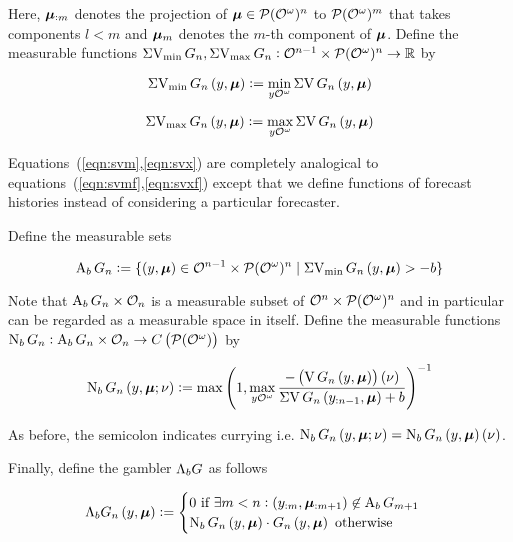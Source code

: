 Here, $\bm{\mu}_{:m}$ denotes the projection of $\bm{\mu} \in \mathcal{P}(\mathcal{O}^\omega)^n$ to $\mathcal{P}(\mathcal{O}^\omega)^m$ that takes components $l < m$ and $\bm{\mu}_m$ denotes the $m$-th component of $\bm{\mu}$. Define the measurable functions $\operatorname{\Sigma V_{\min}} G_n, \operatorname{\Sigma V_{\max}} G_n: \mathcal{O}^{n-1} \times \mathcal{P}(\mathcal{O}^\omega)^n  \rightarrow \mathbb{R}$ by

\begin{equation}
\label{eqn:svm}
\operatorname{\Sigma V_{\min}} G_n\left(y,\bm{\mu}\right) := \min_{y\mathcal{O}^\omega}{\operatorname{\Sigma V} G_n\left(y,\bm{\mu}\right)}
\end{equation}

\begin{equation}
\label{eqn:svx}
\operatorname{\Sigma V_{\max}} G_n\left(y,\bm{\mu}\right) := \max_{y\mathcal{O}^\omega}{\operatorname{\Sigma V} G_n\left(y,\bm{\mu}\right)}
\end{equation}

Equations~(\ref{eqn:svm},\ref{eqn:svx}) are completely analogical to equations~(\ref{eqn:svmf},\ref{eqn:svxf}) except that we define functions of forecast histories instead of considering a particular forecaster.

Define the measurable sets

\begin{equation}
\operatorname{A}_b G_n:=\{\left(y,\bm{\mu}\right) \in \mathcal{O}^{n-1} \times \mathcal{P}(\mathcal{O}^\omega)^n \mid \operatorname{\Sigma V_{\min}} G_n\left(y,\bm{\mu}\right) > -b\}
\end{equation}

Note that $\operatorname{A}_b G_n \times \mathcal{O}_n$ is a measurable subset of $\mathcal{O}^n \times \mathcal{P}(\mathcal{O}^\omega)^n$ and in particular can be regarded as a measurable space in itself. Define the measurable functions $\operatorname{N}_b G_n: \operatorname{A}_b G_n \times \mathcal{O}_n \rightarrow C\left(\mathcal{P}(\mathcal{O}^\omega)\right)$ by

\begin{equation}
\operatorname{N}_b G_n\left(y,\bm{\mu};\nu\right):=\max\left(1,\max_{y\mathcal{O}^\omega} \frac{-\left(\operatorname{V} G_n\left(y,\bm{\mu}\right)\right)\left(\nu\right)}{\operatorname{\Sigma V} G_n\left(y_{:n-1},\bm{\mu}\right)+b}\right)^{-1}
\end{equation}

As before, the semicolon indicates currying i.e. $\operatorname{N}_b G_n\left(y,\bm{\mu};\nu\right)=\operatorname{N}_b G_n\left(y,\bm{\mu}\right)(\nu)$.

Finally, define the gambler $\Lambda_b G$ as follows

\begin{equation}
\Lambda_b G_n\left(y,\bm{\mu}\right):=\begin{cases} 0 \text{ if } \exists m < n: \left(y_{:m},\bm{\mu}_{:m+1}\right) \not\in \operatorname{A}_b G_{m+1} \\ \operatorname{N}_b G_n\left(y,\bm{\mu}\right) \cdot G_n\left(y, \bm{\mu}\right) \text{ otherwise} \end{cases}
\end{equation}

